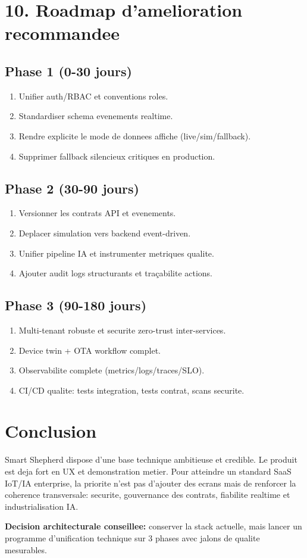\documentclass[12pt,a4paper]{article}
\begin{document}
\section{10. Roadmap d'amelioration recommandee}
\subsection{Phase 1 (0-30 jours)}
\begin{enumerate}
  \item Unifier auth/RBAC et conventions roles.
  \item Standardiser schema evenements realtime.
  \item Rendre explicite le mode de donnees affiche (live/sim/fallback).
  \item Supprimer fallback silencieux critiques en production.
\end{enumerate}

\subsection{Phase 2 (30-90 jours)}
\begin{enumerate}
  \item Versionner les contrats API et evenements.
  \item Deplacer simulation vers backend event-driven.
  \item Unifier pipeline IA et instrumenter metriques qualite.
  \item Ajouter audit logs structurants et traçabilite actions.
\end{enumerate}

\subsection{Phase 3 (90-180 jours)}
\begin{enumerate}
  \item Multi-tenant robuste et securite zero-trust inter-services.
  \item Device twin + OTA workflow complet.
  \item Observabilite complete (metrics/logs/traces/SLO).
  \item CI/CD qualite: tests integration, tests contrat, scans securite.
\end{enumerate}

\section{Conclusion}
Smart Shepherd dispose d'une base technique ambitieuse et credible. Le produit est deja fort en UX et demonstration metier. Pour atteindre un standard SaaS IoT/IA enterprise, la priorite n'est pas d'ajouter des ecrans mais de renforcer la coherence transversale: securite, gouvernance des contrats, fiabilite realtime et industrialisation IA.

\vspace{0.5cm}
\textbf{Decision architecturale conseillee:} conserver la stack actuelle, mais lancer un programme d'unification technique sur 3 phases avec jalons de qualite mesurables.
\end{document}
